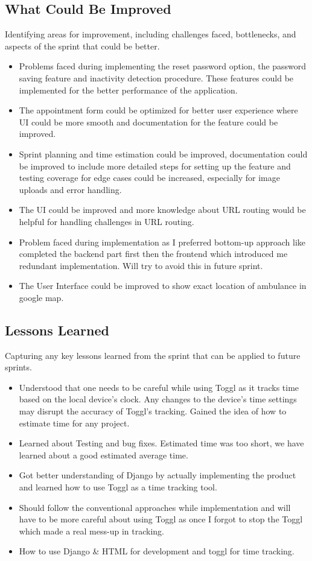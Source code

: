\documentclass[a4paper,12pt]{article}
\begin{document}
\subsection{What Could Be Improved}
Identifying areas for improvement, including challenges faced, bottlenecks, and aspects of the sprint that could be better.
\begin{itemize}
    \item Problems faced during implementing the reset password option, the password saving feature and
        inactivity detection procedure. These features could be implemented for the better performance of the
        application.
    \item The appointment form could be optimized for better user experience where UI could be more smooth and
        documentation for the feature could be improved.
    \item Sprint planning and time estimation could be improved, documentation could be improved to include
        more detailed steps for setting up the feature and testing coverage for edge cases could be increased,
        especially for image uploads and error handling.
    \item The UI could be improved and more knowledge about URL routing would be helpful for handling
        challenges in URL routing.
    \item Problem faced during implementation as I preferred bottom-up approach like completed the backend
        part first then the frontend which introduced me redundant implementation. Will try to avoid this in
        future sprint.
    \item The User Interface could be improved to show exact location of ambulance in google map.
\end{itemize}
\subsection{Lessons Learned}
Capturing any key lessons learned from the sprint that can be applied to future sprints.
\begin{itemize}
    \item Understood that one needs to be careful while using Toggl as it tracks time based on the local
        device's clock. Any changes to the device's time settings may disrupt the accuracy of Toggl's
        tracking. Gained the idea of how to estimate time for any project.
    \item Learned about Testing and bug fixes.
        Estimated time was too short, we have learned about a good estimated average time.
    \item Got better understanding of Django by actually implementing the product and learned how to use Toggl as a time tracking tool.
    \item Should follow the conventional approaches while implementation and will have to be more careful about using Toggl as once I forgot to stop the Toggl which made a real mess-up in tracking.
    \item How to use Django \& HTML for development and toggl for time tracking. 
\end{itemize}
\newpage
\end{document}
